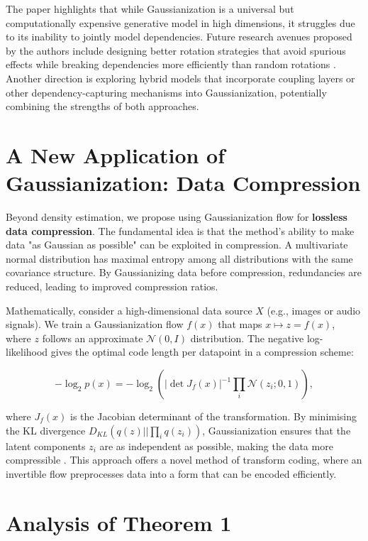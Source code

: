 The paper highlights that while Gaussianization is a universal but computationally expensive generative model in high dimensions, it struggles due to its inability to jointly model dependencies. Future research avenues proposed by the authors include designing better rotation strategies that avoid spurious effects while breaking dependencies more efficiently than random rotations \cite{draxler2023convergence}. Another direction is exploring hybrid models that incorporate coupling layers or other dependency-capturing mechanisms into Gaussianization, potentially combining the strengths of both approaches.

\section{A New Application of Gaussianization: Data Compression}

Beyond density estimation, we propose using Gaussianization flow for \textbf{lossless data compression}. The fundamental idea is that the method's ability to make data "as Gaussian as possible" can be exploited in compression. A multivariate normal distribution has maximal entropy among all distributions with the same covariance structure. By Gaussianizing data before compression, redundancies are reduced, leading to improved compression ratios.

Mathematically, consider a high-dimensional data source $X$ (e.g., images or audio signals). We train a Gaussianization flow $f(x)$ that maps $x \mapsto z = f(x)$, where $z$ follows an approximate $\mathcal{N}(0, I)$ distribution. The negative log-likelihood gives the optimal code length per datapoint in a compression scheme:

\begin{equation}
    -\log_2 p(x) = -\log_2 \left(| \det J_f(x)|^{-1} \prod_{i} \mathcal{N}(z_i; 0,1) \right),
\end{equation}

where $J_f(x)$ is the Jacobian determinant of the transformation. By minimising the KL divergence $D_{\mathit{KL}}(q(z) || \prod_i q(z_i))$, Gaussianization ensures that the latent components $z_i$ are as independent as possible, making the data more compressible \cite{draxler2023convergence}. This approach offers a novel method of transform coding, where an invertible flow preprocesses data into a form that can be encoded efficiently.

\section{Analysis of Theorem 1}

